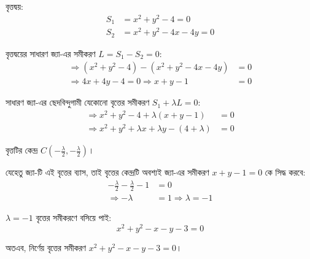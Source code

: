 \documentclass[12pt, a4paper]{article}
\begin{document}
\begin{tcolorbox}[solutionbox={সমাধান (Solution)}]
    \noindent
    বৃত্তদ্বয়: 
    \begin{align*}
        S_1 &= x^2 + y^2 - 4 = 0 \\
        S_2 &= x^2 + y^2 - 4x - 4y = 0
    \end{align*}
    
    \vspace{0.5em}
    বৃত্তদ্বয়ের সাধারণ জ্যা-এর সমীকরণ $L = S_1 - S_2 = 0$:
    \begin{align*}
        \Rightarrow (x^2 + y^2 - 4) - (x^2 + y^2 - 4x - 4y) &= 0 \\
        \Rightarrow 4x + 4y - 4 = 0 \Rightarrow x + y - 1 &= 0
    \end{align*}
    
    \vspace{0.5em}
    সাধারণ জ্যা-এর ছেদবিন্দুগামী যেকোনো বৃত্তের সমীকরণ $S_1 + \lambda L = 0$:
    \begin{align*}
        \Rightarrow x^2 + y^2 - 4 + \lambda(x + y - 1) &= 0 \\
        \Rightarrow x^2 + y^2 + \lambda x + \lambda y - (4 + \lambda) &= 0
    \end{align*}
    
    \vspace{0.5em}
    বৃত্তটির কেন্দ্র $C\left(-\frac{\lambda}{2}, -\frac{\lambda}{2}\right)$।
    
    \vspace{0.5em}
    যেহেতু জ্যা-টি এই বৃত্তের ব্যাস, তাই বৃত্তের কেন্দ্রটি অবশ্যই জ্যা-এর সমীকরণ $x + y - 1 = 0$ কে সিদ্ধ করবে:
    \begin{align*}
        -\frac{\lambda}{2} - \frac{\lambda}{2} - 1 &= 0 \\
        \Rightarrow -\lambda &= 1 \Rightarrow \lambda = -1
    \end{align*}
    
    \vspace{0.5em}
    $\lambda = -1$ বৃত্তের সমীকরণে বসিয়ে পাই:
    \[ x^2 + y^2 - x - y - 3 = 0 \]
    
    \vspace{0.5em}
    অতএব, নির্ণেয় বৃত্তের সমীকরণ $x^2 + y^2 - x - y - 3 = 0$।
\end{tcolorbox}

\vspace{2em}
\end{document}
